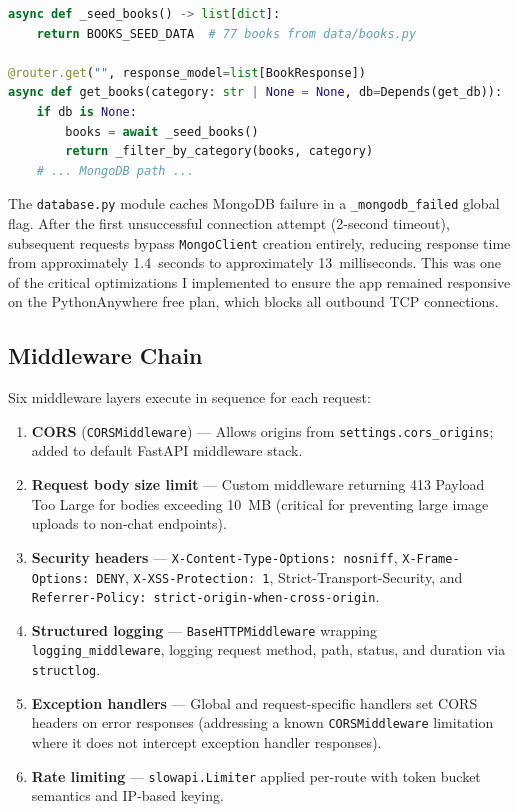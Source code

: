 \documentclass[11pt,a4paper]{article}
\begin{document}
\begin{lstlisting}[language=Python, caption=Seed data fallback in books router]
async def _seed_books() -> list[dict]:
    return BOOKS_SEED_DATA  # 77 books from data/books.py

@router.get("", response_model=list[BookResponse])
async def get_books(category: str | None = None, db=Depends(get_db)):
    if db is None:
        books = await _seed_books()
        return _filter_by_category(books, category)
    # ... MongoDB path ...
\end{lstlisting}

The \texttt{database.py} module caches MongoDB failure in a \texttt{\_mongodb\_failed} global flag. After the first unsuccessful connection attempt (2-second timeout), subsequent requests bypass \texttt{MongoClient} creation entirely, reducing response time from approximately 1.4~seconds to approximately 13~milliseconds. This was one of the critical optimizations I implemented to ensure the app remained responsive on the PythonAnywhere free plan, which blocks all outbound TCP connections.

\subsection{Middleware Chain}

Six middleware layers execute in sequence for each request:

\begin{enumerate}
    \item \textbf{CORS} (\texttt{CORSMiddleware}) --- Allows origins from \texttt{settings.cors\_origins}; added to default FastAPI middleware stack.
    \item \textbf{Request body size limit} --- Custom middleware returning 413 Payload Too Large for bodies exceeding 10~MB (critical for preventing large image uploads to non-chat endpoints).
    \item \textbf{Security headers} --- \texttt{X-Content-Type-Options: nosniff}, \texttt{X-Frame-Options: DENY}, \texttt{X-XSS-Protection: 1}, Strict-Transport-Security, and \texttt{Referrer-Policy: strict-origin-when-cross-origin}.
    \item \textbf{Structured logging} --- \texttt{BaseHTTPMiddleware} wrapping \texttt{logging\_middleware}, logging request method, path, status, and duration via \texttt{structlog}.
    \item \textbf{Exception handlers} --- Global and request-specific handlers set CORS headers on error responses (addressing a known \texttt{CORSMiddleware} limitation where it does not intercept exception handler responses).
    \item \textbf{Rate limiting} --- \texttt{slowapi.Limiter} applied per-route with token bucket semantics and IP-based keying.
\end{enumerate}
\clearpage
\end{document}
